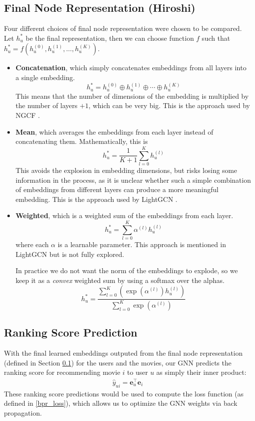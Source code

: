 \documentclass{article}
\begin{document}
\subsection{Final Node Representation (Hiroshi)} \label{final_node_representation}

Four different choices of final node representation were chosen to be compared. Let $h_u^*$ be the final representation, then we can choose function $f$ such that $h_u^*=f(h_u^{(0)},h_u^{(1)},\hdots,h_u^{(K)})$.

\begin{itemize}
    \item \textbf{Concatenation}, which simply concatenates embeddings from all layers into a single embedding.
    $$h_u^*=h_u^{(0)} \oplus h_u^{(1)} \oplus \cdots \oplus h_u^{(K)}$$
    This means that the number of dimensions of the embedding is multiplied by the number of layers $+1$, which can be very big. This is the approach used by NGCF \cite{ngcf}.
    \item \textbf{Mean}, which averages the embeddings from each layer instead of concatenating them. Mathematically, this is
    $$h_u^*=\frac{1}{K+1}\sum_{l=0}^Kh_u^{(l)}$$
    This avoids the explosion in embedding dimensions, but risks losing some information in the process, as it is unclear whether such a simple combination of embeddings from different layers can produce a more meaningful embedding. This is the approach used by LightGCN \cite{lightgcn}.
    \item \textbf{Weighted}, which is a weighted sum of the embeddings from each layer.
    $$h_u^*=\sum_{l=0}^K\alpha^{(l)}h_u^{(l)}$$
    where each $\alpha$ is a learnable parameter. This approach is mentioned in LightGCN \cite{lightgcn} but is not fully explored.
    
    In practice we do not want the norm of the embeddings to explode, so we keep it as a \textit{convex} weighted sum by using a softmax over the alphas.
    $$h_u^*=\frac{\sum_{l=0}^K (\exp(\alpha^{(l)})h_u^{(l)})}{\sum_{l=0}^K \exp(\alpha^{(l)})}$$
\end{itemize}

\subsection{Ranking Score Prediction}

With the final learned embeddings outputed from the final node representation (defined in Section \ref{final_node_representation}) for the users and the movies, our GNN predicts the ranking score for recommending movie $i$ to user $u$ as simply their inner product:
\begin{align*}
    \hat{y}_{ui} = \mathbf{e}_u^\top \mathbf{e}_i
\end{align*}
These ranking score predictions would be used to compute the loss function (as defined in \ref{bpr_loss}), which allows us to optimize the GNN weights via back propagation.
\end{document}

